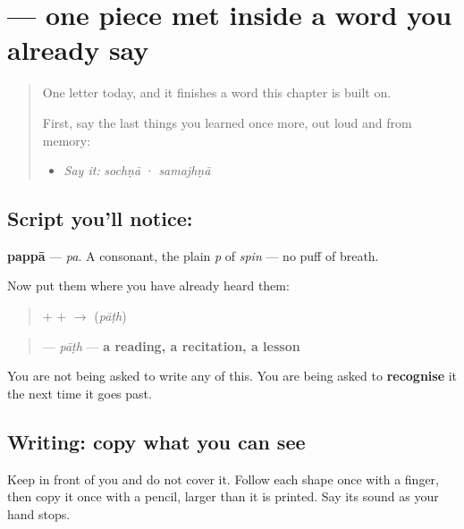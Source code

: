 \section[\texorpdfstring{\pa{ਪ} (pa)}{ਪ (pa)}]{ — one piece met inside a word you already say}

\label{lesson:PA-S08-pappa}



\begin{quote}
One letter today, and it finishes a word this chapter is built on.

First, say the last things you learned once more, out loud and from memory:

\begin{itemize}
\raggedright
  \item \emph{Say it:} \emph{sochṇā} · \emph{samajhṇā}
\end{itemize}
\end{quote}

\subsection*{Script you'll notice: }
\begin{quote}
\end{quote}

\textbf{pappā} — \emph{pa}. A consonant, the plain \emph{p} of \emph{spin} — no puff of breath.

Now put them where you have already heard them:

\begin{quote}
\textbf{} + \textbf{} + \textbf{} $\to$ \textbf{} (\emph{pāṭh})
\end{quote}

\begin{quote}
\textbf{} — \emph{pāṭh} — \textbf{a reading, a recitation, a lesson}
\end{quote}

You are not being asked to write any of this. You are being asked to \textbf{recognise} it the next time it goes past.

\subsection*{Writing: copy what you can see}

Keep  in front of you and do not cover it. Follow each shape once with a finger, then copy it once with a pencil, larger than it is printed. Say its sound as your hand stops.

